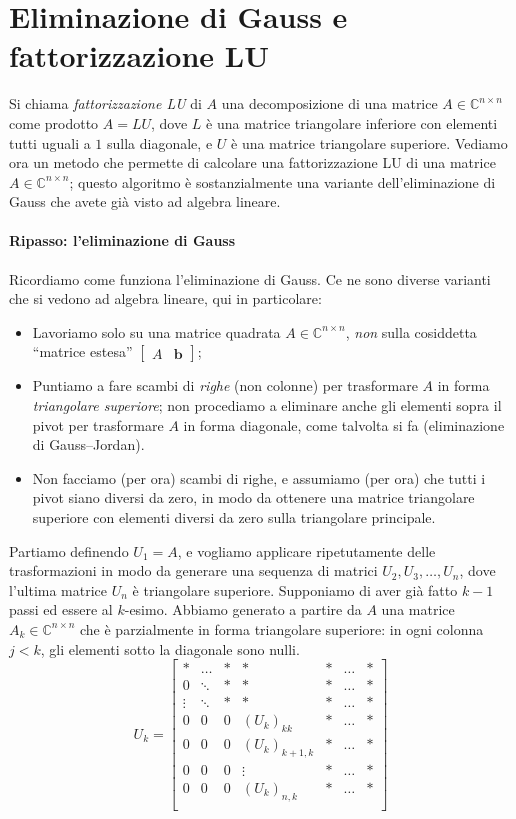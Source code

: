 \documentclass[a4paper]{report}
\theoremstyle{definiton}
\theoremstyle{remark}
\renewcommand{\b}{\mathbf{b}}
\begin{document}
\section{Eliminazione di Gauss e fattorizzazione LU}

Si chiama \emph{fattorizzazione LU} di $A$ una decomposizione di una matrice $A\in\mathbb{C}^{n\times n}$ come prodotto $A=LU$, dove $L$ è una matrice triangolare inferiore con elementi tutti uguali a $1$ sulla diagonale, e $U$ è una matrice triangolare superiore. Vediamo ora un metodo che permette di calcolare una fattorizzazione LU di una matrice $A \in \mathbb{C}^{n\times n}$; questo algoritmo è sostanzialmente una variante dell'eliminazione di Gauss che avete già visto ad algebra lineare.

\paragraph{Ripasso: l'eliminazione di Gauss} Ricordiamo come funziona l'eliminazione di Gauss. Ce ne sono diverse varianti che si vedono ad algebra lineare, qui in particolare:
\begin{itemize}
    \item Lavoriamo solo su una matrice quadrata $A\in\mathbb{C}^{n\times n}$, \emph{non} sulla cosiddetta ``matrice estesa'' $\begin{bmatrix}
    A & \b
\end{bmatrix}$;
    \item Puntiamo a fare scambi di \emph{righe} (non colonne) per trasformare $A$ in forma \emph{triangolare superiore}; non procediamo a eliminare anche gli elementi sopra il pivot per trasformare $A$ in forma diagonale, come talvolta si fa (eliminazione di Gauss--Jordan).
    \item Non facciamo (per ora) scambi di righe, e assumiamo (per ora) che tutti i pivot siano diversi da zero, in modo da ottenere una matrice triangolare superiore con elementi diversi da zero sulla triangolare principale.
\end{itemize}
Partiamo definendo $U_1 = A$, e vogliamo applicare ripetutamente delle trasformazioni in modo da generare una sequenza di matrici $U_2, U_3, \dots, U_n$, dove l'ultima matrice $U_n$ è triangolare superiore. Supponiamo di aver già fatto $k-1$ passi ed essere al $k$-esimo. Abbiamo generato a partire da $A$ una matrice $A_k \in\mathbb{C}^{n\times n}$ che è parzialmente in forma triangolare superiore: in ogni colonna $j<k$, gli elementi sotto la diagonale sono nulli. 
\[
U_k = \begin{bmatrix}
    \ast & \dots & \ast & \ast & \ast & \dots & \ast\\
    0 & \ddots & \ast& \ast & \ast& \dots & \ast\\
    \vdots & \ddots & \ast & \ast& \ast & \dots & \ast\\
    0& 0  &0 & (U_k)_{kk} & \ast & \dots & \ast\\
    0& 0  &0 & (U_k)_{k+1,k} & \ast & \dots & \ast\\
    0& 0  &0 & \vdots & \ast & \dots & \ast\\
    0& 0  &0 & (U_k)_{n,k} & \ast & \dots & \ast\\
\end{bmatrix}
\]
\end{document}
